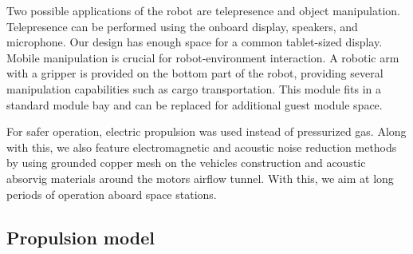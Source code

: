 \documentclass[review]{elsarticle}
\begin{document}

Two possible applications of the robot are telepresence and object
manipulation. Telepresence can be performed using the onboard display,
speakers, and microphone. Our design has enough space for a common
tablet-sized display. Mobile manipulation is crucial for robot-environment interaction. A robotic arm with a gripper is provided on the bottom part of the robot, providing several manipulation capabilities such as cargo transportation. This module fits in a standard module bay and can be replaced for additional guest module space.

For safer operation, electric propulsion was used instead of pressurized gas. Along with this, we also feature electromagnetic and acoustic noise reduction methods by using grounded copper mesh on the vehicles construction and acoustic absorvig materials around the motors airflow tunnel. With this, we aim at long periods of operation aboard space stations.


\subsection{Propulsion model}
\label{sec:propulsion-model}



\end{document}
